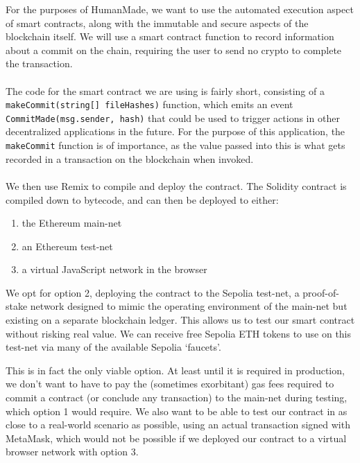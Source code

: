 \documentclass[12pt,a4paper]{article}
\begin{document}
For the purposes of HumanMade, we want to use the automated execution aspect of smart contracts, along with the immutable and secure aspects of the blockchain itself. We will use a smart contract function to record information about a commit on the chain, requiring the user to send no crypto to complete the transaction.
\\\\
The code for the smart contract we are using is fairly short, consisting of a 
\\\verb|makeCommit(string[] fileHashes)| function, which emits an event\\ \verb|CommitMade(msg.sender, hash)| that could be used to trigger actions in other decentralized applications in the future. For the purpose of this application, the \verb|makeCommit| function is of importance, as the value passed into this is what gets recorded in a transaction on the blockchain when invoked.\\\\
We then use Remix to compile and deploy the contract. The Solidity contract is compiled down to bytecode, and can then be deployed to either:
\begin{enumerate}
    \item the Ethereum main-net
    \item an Ethereum test-net
    \item a virtual JavaScript network in the browser
\end{enumerate}
We opt for option 2, deploying the contract to the Sepolia test-net, a proof-of-stake network designed to mimic the operating environment of the main-net but existing on a separate blockchain ledger. This allows us to test our smart contract without risking real value. We can receive free Sepolia ETH tokens to use on this test-net via many of the available Sepolia `faucets'.

This is in fact the only viable option. At least until it is required in production, we don't want to have to pay the (sometimes exorbitant) gas fees required to commit a contract (or conclude any transaction) to the main-net during testing, which option 1 would require. We also want to be able to test our contract in as close to a real-world scenario as possible, using an actual transaction signed with MetaMask, which would not be possible if we deployed our contract to a virtual browser network with option 3.
\end{document}
